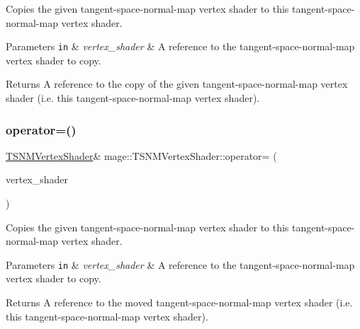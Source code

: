 Copies the given tangent-\/space-\/normal-\/map vertex shader to this tangent-\/space-\/normal-\/map vertex shader.


\begin{DoxyParams}[1]{Parameters}
\mbox{\tt in}  & {\em vertex\+\_\+shader} & A reference to the tangent-\/space-\/normal-\/map vertex shader to copy. \\
\hline
\end{DoxyParams}
\begin{DoxyReturn}{Returns}
A reference to the copy of the given tangent-\/space-\/normal-\/map vertex shader (i.\+e. this tangent-\/space-\/normal-\/map vertex shader). 
\end{DoxyReturn}
\hypertarget{classmage_1_1_t_s_n_m_vertex_shader_a84e30879d000172f309d7ec2f27c3ed1}{}\label{classmage_1_1_t_s_n_m_vertex_shader_a84e30879d000172f309d7ec2f27c3ed1} 
\subsubsection{\texorpdfstring{operator=()}{operator=()}\hspace{0.1cm}{\footnotesize\ttfamily [2/2]}}
{\footnotesize\ttfamily \hyperlink{classmage_1_1_t_s_n_m_vertex_shader}{T\+S\+N\+M\+Vertex\+Shader}\& mage\+::\+T\+S\+N\+M\+Vertex\+Shader\+::operator= (\begin{DoxyParamCaption}\item[{\hyperlink{classmage_1_1_t_s_n_m_vertex_shader}{T\+S\+N\+M\+Vertex\+Shader} \&\&}]{vertex\+\_\+shader }\end{DoxyParamCaption})\hspace{0.3cm}{\ttfamily [delete]}}

Copies the given tangent-\/space-\/normal-\/map vertex shader to this tangent-\/space-\/normal-\/map vertex shader.


\begin{DoxyParams}[1]{Parameters}
\mbox{\tt in}  & {\em vertex\+\_\+shader} & A reference to the tangent-\/space-\/normal-\/map vertex shader to copy. \\
\hline
\end{DoxyParams}
\begin{DoxyReturn}{Returns}
A reference to the moved tangent-\/space-\/normal-\/map vertex shader (i.\+e. this tangent-\/space-\/normal-\/map vertex shader). 
\end{DoxyReturn}
\hypertarget{classmage_1_1_t_s_n_m_vertex_shader_ad9ee77f591466d7843bcd413e3d7093d}{}\label{classmage_1_1_t_s_n_m_vertex_shader_ad9ee77f591466d7843bcd413e3d7093d} 
